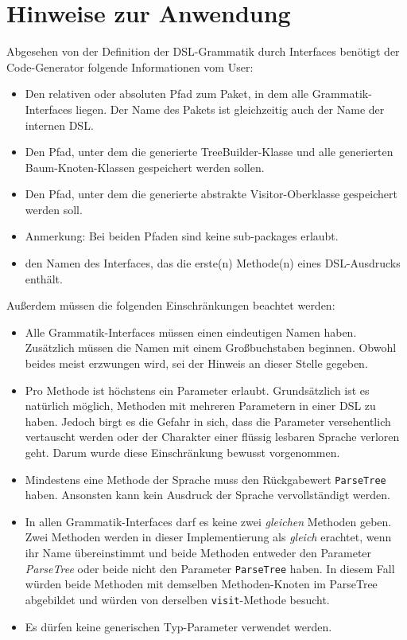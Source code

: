 \section{Hinweise zur Anwendung}\label{sct:6.1:hinweise}
Abgesehen von der Definition der DSL-Grammatik durch Interfaces benötigt der Code-Generator folgende Informationen vom User:

\begin{itemize}
	 \item Den relativen oder absoluten Pfad zum Paket, in dem alle Grammatik-Interfaces liegen. Der Name des Pakets ist gleichzeitig auch der Name der internen DSL.
	 \item Den Pfad, unter dem die generierte TreeBuilder-Klasse und alle generierten Baum-Knoten-Klassen gespeichert werden sollen.
	 \item Den Pfad, unter dem die generierte abstrakte Visitor-Oberklasse gespeichert werden soll.
	 \item Anmerkung: Bei beiden Pfaden sind keine sub-packages erlaubt.
	 \item den Namen des Interfaces, das die erste(n) Methode(n) eines DSL-Ausdrucks enthält.
\end{itemize}

\noindent
Außerdem müssen die folgenden Einschränkungen beachtet werden:

\begin{itemize}
	\item Alle Grammatik-Interfaces müssen einen eindeutigen Namen haben. Zusätzlich müssen die Namen mit einem Großbuchstaben beginnen. Obwohl beides meist erzwungen wird, sei der Hinweis an dieser Stelle gegeben.
	\item Pro Methode ist höchstens ein Parameter erlaubt. Grundsätzlich ist es natürlich möglich, Methoden mit mehreren Parametern in einer DSL zu haben. Jedoch birgt es die Gefahr in sich, dass die Parameter versehentlich vertauscht werden oder der Charakter einer flüssig lesbaren Sprache verloren geht. Darum wurde diese Einschränkung bewusst vorgenommen.
	\item Mindestens eine Methode der Sprache muss den Rückgabewert \texttt{ParseTree} haben. Ansonsten kann kein Ausdruck der Sprache vervollständigt werden.
	\item In allen Grammatik-Interfaces darf es keine zwei \emph{gleichen} Methoden geben. Zwei Methoden werden in dieser Implementierung als \emph{gleich} erachtet, wenn ihr Name übereinstimmt und beide Methoden entweder den Parameter \emph{ParseTree} oder beide nicht den Parameter \texttt{ParseTree} haben. In diesem Fall würden beide Methoden mit demselben Methoden-Knoten im ParseTree abgebildet und würden von derselben \texttt{visit}-Methode besucht.
	\item Es dürfen keine generischen Typ-Parameter verwendet werden.
\end{itemize}